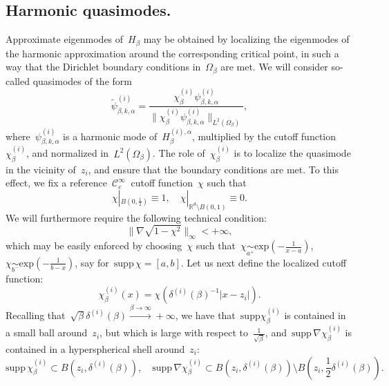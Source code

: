 \documentclass[10pt]{article}
\newcommand{\R}{\mathbb{R}}
\newcommand{\1}{\mathbbm 1}
\newcommand{\supp}{\mathrm{supp}}
\newcommand{\deltai}{\delta^{(i)}}
\begin{document}
    \subsection{Harmonic quasimodes.}\label{subsec:quasimodes}
    Approximate eigenmodes of~$H_\beta$ may be obtained by localizing the eigenmodes of the harmonic approximation around the corresponding critical point, in such a way that the Dirichlet boundary conditions in~$\Omega_\beta$ are met.
    We will consider so-called quasimodes of the form
    \begin{equation}
        \label{eq:harm_quasimode}
        \widetilde\psi^{(i)}_{\beta,k,\alpha} = \frac{\chi_\beta^{(i)}\psi_{\beta,k,\alpha}^{(i)}}{\|\chi_\beta^{(i)}\psi_{\beta,k,\alpha}^{(i)}\|_{L^2(\Omega_\beta)}},
    \end{equation}
    where~$\psi_{\beta,k,\alpha}^{(i)}$ is a harmonic mode of~$H_\beta^{(i),\alpha}$, multiplied by the cutoff function~$\chi_\beta^{(i)}$, and normalized in~$L^2(\Omega_\beta)$.
    The role of~$\chi_\beta^{(i)}$ is to localize the quasimode in the vicinity of~$z_i$, and ensure that the boundary conditions are met. To this effect, we fix a reference~$\mathcal C_c^\infty~$ cutoff function~$\chi$ such that
    \[\chi|_{B\left(0,\frac12\right)}\equiv 1,\quad \chi|_{\R^d\setminus B(0,1)} \equiv 0.\]
    We will furthermore require the following technical condition:
    \begin{equation}
        \label{eq:partition_of_unity_condition}
        \|\nabla\sqrt{1-\chi^2}\|_\infty < +\infty,
    \end{equation}
    which may be easily enforced by choosing~$\chi$ such that~$\chi \underset{a^+}{\sim} \mathrm{exp}\left(-\frac1{x-a}\right)$,~$\chi\underset{b^-}{\sim}\mathrm{exp}\left(-\frac1{b-x}\right)$, say for~$\supp\,\chi = [a,b]$.
    Let us next define the localized cutoff function:
    \begin{equation}
        \label{eq:cutoff}
        \chi_\beta^{(i)}(x) = \chi(\deltai(\beta)^{-1}|x-z_i|).
    \end{equation}
    Recalling that~$\sqrt\beta\deltai(\beta)\overset{\beta\to\infty}{\longrightarrow} + \infty$, we have that~$\supp \chi_\beta^{(i)}$ is contained in a small ball around~$z_i$, but which is large with respect to~$\frac1{\sqrt\beta}$, and~$\supp\,\nabla \chi_\beta^{(i)}$ is contained in a hyperspherical shell around~$z_i$:
    \begin{equation}
        \label{eq:cutoff_supports}
        \supp\,\chi_\beta^{(i)} \subset B(z_i,\deltai(\beta)),\quad\supp\,\nabla\chi_\beta^{(i)} \subset B(z_i,\deltai(\beta))\setminus B\left(z_i,\frac12\deltai(\beta)\right).
    \end{equation}
\end{document}

